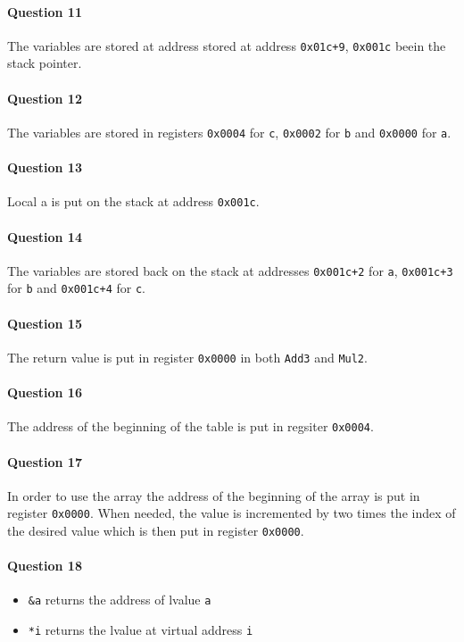 \documentclass[10pt]{article}
\begin{document}
\paragraph{Question 11}
The variables are stored at address stored at address \verb!0x01c+9!, \verb!0x001c! beein the stack pointer.

\paragraph{Question 12}
The variables are stored in registers \verb!0x0004! for \verb!c!, \verb!0x0002! for \verb!b! and \verb!0x0000! for \verb!a!.

\paragraph{Question 13}
Local a is put on the stack at address \verb!0x001c!.

\paragraph{Question 14}
The variables are stored back on the stack at addresses \verb!0x001c+2! for \verb!a!, \verb!0x001c+3! for \verb!b! and \verb!0x001c+4! for \verb!c!.

\paragraph{Question 15}
The return value is put in register \verb!0x0000! in both \verb!Add3! and \verb!Mul2!.

\paragraph{Question 16}
The address of the beginning of the table is put in regsiter \verb!0x0004!.

\paragraph{Question 17}
In order to use the array the address of the beginning of the array is put in register \verb!0x0000!. When needed, the value is incremented by two times the index of the desired value which is then put in register \verb!0x0000!.

\paragraph{Question 18}
\begin{itemize}
\item \verb!&a! returns the address of lvalue \verb!a!
\item \verb!*i! returns the lvalue at virtual address \verb!i!
\end{itemize}
\end{document}
